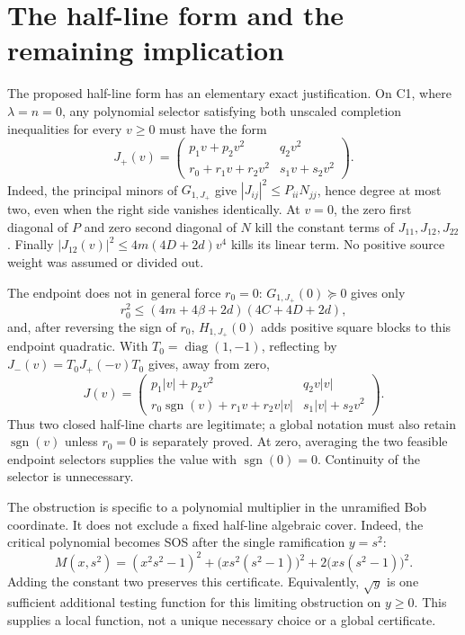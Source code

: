 \documentclass[11pt]{article}
\begin{document}
\section{The half-line form and the remaining implication}
The proposed half-line form has an elementary exact justification.
On C1, where $\lambda=n=0$, any polynomial selector satisfying both
unscaled completion inequalities for every $v\geq0$ must have the form
\begin{equation}\label{eq:halfline-selector}
J_+(v)=\begin{pmatrix}
p_1v+p_2v^2&q_2v^2\\
r_0+r_1v+r_2v^2&s_1v+s_2v^2
\end{pmatrix}.
\end{equation}
Indeed, the principal minors of $G_{1,J_+}$ give
$|J_{ij}|^2\leq P_{ii}N_{jj}$, hence degree at most two, even when
the right side vanishes identically. At $v=0$, the zero first diagonal of
$P$ and zero second diagonal of $N$ kill the constant terms of
$J_{11},J_{12},J_{22}$. Finally
$|J_{12}(v)|^2\leq4m(4D+2d)v^4$ kills its linear term.
No positive source weight was assumed or divided out.

The endpoint does not in general force $r_0=0$:
$G_{1,J_+}(0)\succeq0$ gives only
\[
r_0^2\leq(4m+4\beta+2d)(4C+4D+2d),
\]
and, after reversing the sign of $r_0$, $H_{1,J_+}(0)$ adds positive
square blocks to this endpoint quadratic. With
$T_0=\operatorname{diag}(1,-1)$, reflecting by
$J_-(v)=T_0J_+(-v)T_0$ gives, away from zero,
\[
J(v)=\begin{pmatrix}
p_1|v|+p_2v^2&q_2v|v|\\
r_0\operatorname{sgn}(v)+r_1v+r_2v|v|&s_1|v|+s_2v^2
\end{pmatrix}.
\]
Thus two closed half-line charts are legitimate; a global notation must
also retain $\operatorname{sgn}(v)$ unless $r_0=0$ is separately proved.
At zero, averaging the two feasible endpoint selectors supplies the value
with $\operatorname{sgn}(0)=0$. Continuity of the selector is unnecessary.

The obstruction is specific to a polynomial multiplier in the unramified
Bob coordinate. It does not exclude a fixed half-line algebraic cover.
Indeed, the critical polynomial becomes SOS after the single ramification
$y=s^2$:
\begin{equation}\label{eq:halfline}
\boxed{M(x,s^2)=(x^2s^2-1)^2+\bigl(xs^2(s^2-1)\bigr)^2
+2\bigl(xs(s^2-1)\bigr)^2.}
\end{equation}
Adding the constant two preserves this certificate. Equivalently, $\sqrt y$
is one sufficient additional testing function for this limiting obstruction
on $y\geq0$. This supplies a local function, not a unique necessary choice
or a global certificate.
\end{document}
